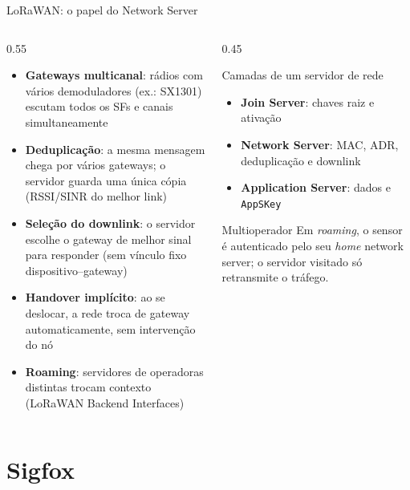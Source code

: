 \documentclass[aspectratio=169,11pt]{beamer}
\begin{document}
\begin{frame}{LoRaWAN: o papel do Network Server}
  \small
  \begin{columns}
    \begin{column}{0.55\textwidth}
      \begin{itemize}
        \item \textbf{Gateways multicanal}: rádios com vários demoduladores (ex.: SX1301) escutam todos os SFs e canais simultaneamente
        \item \textbf{Deduplicação}: a mesma mensagem chega por vários gateways; o servidor guarda uma única cópia (RSSI/SINR do melhor link)
        \item \textbf{Seleção do downlink}: o servidor escolhe o gateway de melhor sinal para responder (sem vínculo fixo dispositivo--gateway)
        \item \textbf{Handover implícito}: ao se deslocar, a rede troca de gateway automaticamente, sem intervenção do nó
        \item \textbf{Roaming}: servidores de operadoras distintas trocam contexto (LoRaWAN Backend Interfaces)
      \end{itemize}
    \end{column}
    \begin{column}{0.45\textwidth}
      \begin{block}{Camadas de um servidor de rede}
        \begin{itemize}
          \item \textbf{Join Server}: chaves raiz e ativação
          \item \textbf{Network Server}: MAC, ADR, deduplicação e downlink
          \item \textbf{Application Server}: dados e \texttt{AppSKey}
        \end{itemize}
      \end{block}
      \pause
      \begin{exampleblock}{Multioperador}
        Em \emph{roaming}, o sensor é autenticado pelo seu \emph{home} network server; o servidor visitado só retransmite o tráfego.
      \end{exampleblock}
    \end{column}
  \end{columns}
\end{frame}

\section{Sigfox}
\end{document}

